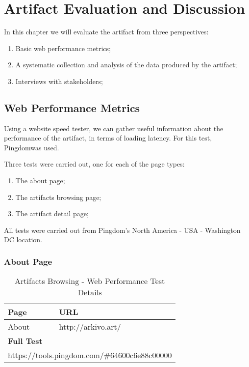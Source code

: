 
\chapter{Artifact Evaluation and Discussion}

In this chapter we will evaluate the artifact from three perspectives:

\begin{enumerate}
    \item Basic web performance metrics;
    \item A systematic collection and analysis of the data produced by the artifact;
    \item Interviews with stakeholders;
\end{enumerate}


\section{Web Performance Metrics}

Using a website speed tester, we can gather useful information about the performance of the artifact, in terms of loading latency. For this test, Pingdom\footnotemark[1] was used.


Three tests were carried out, one for each of the page types:

\begin{enumerate}
    \item The about page;
    \item The artifacts browsing page;
    \item The artifact detail page;
\end{enumerate}

All tests were carried out from Pingdom's North America - USA - Washington DC location.

\subsection{About Page}


\begin{table}[H]
\footnotesize
\centering
\begin{tabular}{|ll|}
\hline
\multicolumn{1}{|l|}{\textbf{Page}} & \textbf{URL}                                                 \\ \hline
\multicolumn{1}{|l|}{About}         & http://arkivo.art/ \\ \hline
\multicolumn{2}{|l|}{\textbf{Full Test}}                                                                    \\ \hline
\multicolumn{2}{|l|}{https://tools.pingdom.com/\#64600c6e88c00000}                                 \\ \hline
\end{tabular}
\caption{Artifacts Browsing - Web Performance Test Details}
\label{table:browsing-test-details}
\end{table}


